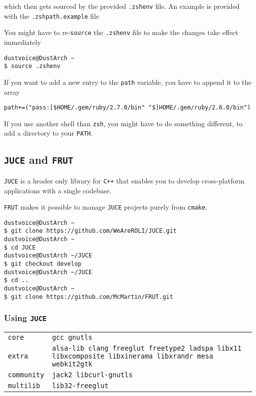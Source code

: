 \documentclass[9pt]{report}
\newenvironment{NOTE}
{\begin{tcolorbox}[colback=admonitionBG,coltitle=draculaFG,colframe=draculaBlue,colbacktitle=draculaBlue,title=NOTE]}
{\end{tcolorbox}}
\newenvironment{packagetable}
{\begin{longtabu}to \textwidth [b]{X[1,r]|X[1,l]}}
{\end{longtabu}}
\begin{document}
which then gets sourced by the provided \texttt{.zshenv} file.
An example is provided with the \texttt{.zshpath.example} file


\begin{NOTE}
    You might have to re-\texttt{source} the \texttt{.zshenv} file to make the changes take effect immediately


    \begin{verbatim}
dustvoice@DustArch ~
$ source .zshenv
    \end{verbatim}
\end{NOTE}
\begin{NOTE}
    If you want to add a new entry to the \texttt{path} variable, you have to append it to the array


    \begin{verbatim}
path+=("pass:[$HOME/.gem/ruby/2.7.0/bin" "$]HOME/.gem/ruby/2.6.0/bin")
    \end{verbatim}
\end{NOTE}
\begin{NOTE}
    If you use another shell than \texttt{zsh}, you might have to do something different, to add a directory to your \texttt{PATH}.

\end{NOTE}

\newpage

\hypertarget{x-juce-and-frut}{\subsection{\texttt{JUCE} and \texttt{FRUT}}}
\texttt{JUCE} is a header only library for \texttt{C++} that enables you to develop cross-platform applications with a single codebase.


\texttt{FRUT} makes it possible to manage \texttt{JUCE} projects purely from \texttt{cmake}.


\begin{verbatim}
dustvoice@DustArch ~
$ git clone https://github.com/WeAreROLI/JUCE.git
dustvoice@DustArch ~
$ cd JUCE
dustvoice@DustArch ~/JUCE
$ git checkout develop
dustvoice@DustArch ~/JUCE
$ cd ..
dustvoice@DustArch ~
$ git clone https://github.com/McMartin/FRUT.git
\end{verbatim}


\newpage

\hypertarget{x-using-juce}{\subsubsection{Using \texttt{JUCE}}}
\begin{packagetable}
    \texttt{core} & \texttt{gcc gnutls} \\ 
    \texttt{extra} & \texttt{alsa-lib clang freeglut freetype2 ladspa libx11 libxcomposite libxinerama libxrandr mesa webkit2gtk} \\ 
    \texttt{community} & \texttt{jack2 libcurl-gnutls} \\ 
    \texttt{multilib} & \texttt{lib32-freeglut} \\ 
\end{packagetable}
\end{document}
